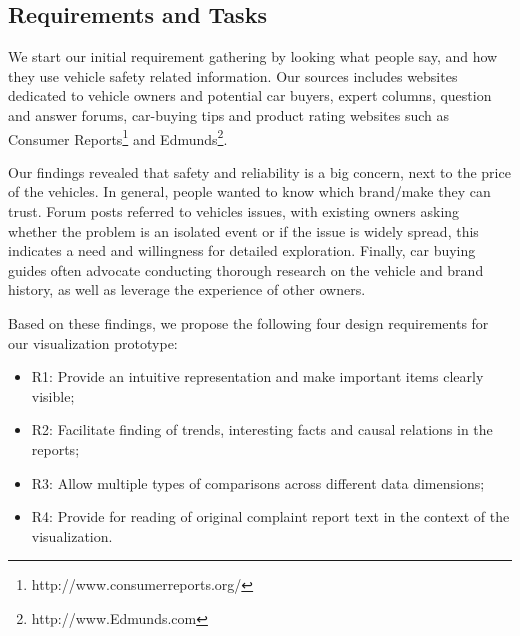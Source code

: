 \subsection{Requirements and Tasks}


We start our initial requirement gathering by looking what people say, and
how they use vehicle safety related information. Our sources includes websites 
dedicated to vehicle owners and potential car buyers, expert columns, 
question and answer forums, car-buying tips and product rating websites such 
as Consumer Reports\footnote{http://www.consumerreports.org/} and
Edmunds\footnote{http://www.Edmunds.com}. 

Our findings revealed that safety and reliability is a big concern, next to the
price of the vehicles. In general, people wanted to know which brand/make 
they can trust. Forum posts referred to vehicles issues, with existing owners 
asking whether the problem is an isolated event or if the issue is widely spread, 
this indicates a need and willingness for detailed exploration. Finally, car buying 
guides often advocate conducting thorough research on the vehicle and brand history, 
as well as leverage the experience of other owners. 
 
Based on these findings, we propose the following four design requirements for
our visualization prototype:
\begin{itemize}[noitemsep]
  \item R1: Provide an intuitive representation and make important items clearly
  visible;
  \item R2: Facilitate finding of trends, interesting facts and causal relations
  in the reports;
  \item R3: Allow multiple types of comparisons across different data
  dimensions;
  \item R4: Provide for reading of original complaint report text in the context
  of the visualization.
\end{itemize}

